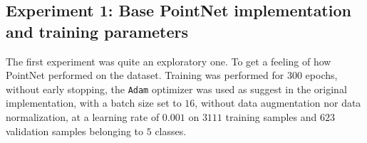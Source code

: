 \documentclass[11pt,a4paper]{article}
\begin{document}
\subsection{Experiment 1: Base PointNet implementation and training parameters}
The first experiment was quite an exploratory one. To get a feeling of how PointNet performed on the dataset. Training was performed for $300$ epochs, without early stopping, the \texttt{Adam} optimizer was used as suggest in the original implementation, with a batch size set to $16$, without data augmentation nor data normalization, at a learning rate of $0.001$ on $3111$ training samples and $623$ validation samples belonging to $5$ classes.
\begin{figure}[H]
    \centering
    \qquad

\end{figure}
\end{document}
